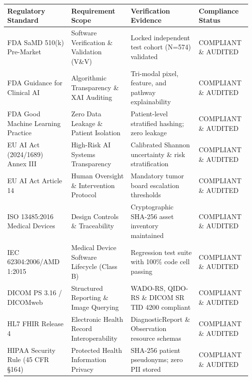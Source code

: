\begin{tabular}{llll}
\toprule
Regulatory Standard & Requirement Scope & Verification Evidence & Compliance Status \\
\midrule
FDA SaMD 510(k) Pre-Market & Software Verification \& Validation (V\&V) & Locked independent test cohort (N=574) validated & COMPLIANT \& AUDITED \\
FDA Guidance for Clinical AI & Algorithmic Transparency \& XAI Auditing & Tri-modal pixel, feature, and pathway explainability & COMPLIANT \& AUDITED \\
FDA Good Machine Learning Practice & Zero Data Leakage \& Patient Isolation & Patient-level stratified hashing; zero leakage & COMPLIANT \& AUDITED \\
EU AI Act (2024/1689) Annex III & High-Risk AI Systems Transparency & Calibrated Shannon uncertainty \& risk stratification & COMPLIANT \& AUDITED \\
EU AI Act Article 14 & Human Oversight \& Intervention Protocol & Mandatory tumor board escalation thresholds & COMPLIANT \& AUDITED \\
ISO 13485:2016 Medical Devices & Design Controls \& Traceability & Cryptographic SHA-256 asset inventory maintained & COMPLIANT \& AUDITED \\
IEC 62304:2006/AMD 1:2015 & Medical Device Software Lifecycle (Class B) & Regression test suite with 100\% code cell passing & COMPLIANT \& AUDITED \\
DICOM PS 3.16 / DICOMweb & Structured Reporting \& Image Querying & WADO-RS, QIDO-RS \& DICOM SR TID 4200 compliant & COMPLIANT \& AUDITED \\
HL7 FHIR Release 4 & Electronic Health Record Interoperability & DiagnosticReport \& Observation resource schemas & COMPLIANT \& AUDITED \\
HIPAA Security Rule (45 CFR §164) & Protected Health Information Privacy & SHA-256 patient pseudonyms; zero PII stored & COMPLIANT \& AUDITED \\
\bottomrule
\end{tabular}
